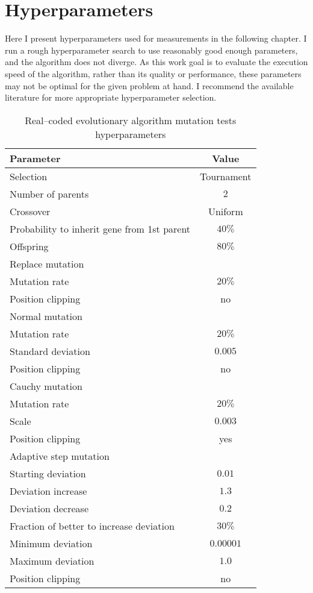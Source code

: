 \chapter{Hyperparameters}
\label{chap:hyperparameters}

Here I present hyperparameters used for measurements in the following chapter. I run a rough hyperparameter search to use reasonably good enough parameters, and the algorithm does not diverge. As this work goal is to evaluate the execution speed of the algorithm, rather than its quality or performance, these parameters may not be optimal for the given problem at hand. I recommend the available literature for more appropriate hyperparameter selection. 

\begin{table}[h]
    \centering
    \begin{tabular}{|l|c|}
        \hline
        \textbf{Parameter} & \textbf{Value} \\
        \hline
        Selection & Tournament \\
        \quad Number of parents & $2$ \\
        Crossover & Uniform \\
        \quad Probability to inherit gene from 1st parent & $40\%$ \\
        \quad Offspring & $80\%$ \\
        \hline
        Replace mutation & \\
        \quad Mutation rate & $20\%$ \\
        \quad Position clipping & no \\
        Normal mutation & \\
        \quad Mutation rate & $20\%$ \\
        \quad Standard deviation & $0.005$ \\
        \quad Position clipping & no \\
        Cauchy mutation & \\
        \quad Mutation rate & $20\%$ \\
        \quad Scale & $0.003$ \\
        \quad Position clipping & yes \\
        Adaptive step mutation & \\
        \quad Starting deviation & $0.01$ \\
        \quad Deviation increase & $1.3$ \\
        \quad Deviation decrease & $0.2$ \\
        \quad Fraction of better to increase deviation & $30\%$ \\
        \quad Minimum deviation & $0.00001$ \\
        \quad Maximum deviation & $1.0$ \\
        \quad Position clipping & no \\
        \hline
    \end{tabular}
    \caption{Real--coded evolutionary algorithm mutation tests hyperparameters}
    \label{tab:esmutationhyperparmarameters}
\end{table}

